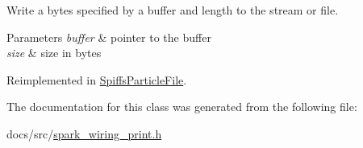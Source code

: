 Write a bytes specified by a buffer and length to the stream or file. 


\begin{DoxyParams}{Parameters}
{\em buffer} & pointer to the buffer \\
\hline
{\em size} & size in bytes \\
\hline
\end{DoxyParams}


Reimplemented in \mbox{\hyperlink{class_spiffs_particle_file_ada3fa1782a929e32adab1c161f9d5eeb}{Spiffs\+Particle\+File}}.



The documentation for this class was generated from the following file\+:\begin{DoxyCompactItemize}
\item 
docs/src/\mbox{\hyperlink{spark__wiring__print_8h}{spark\+\_\+wiring\+\_\+print.\+h}}\end{DoxyCompactItemize}
